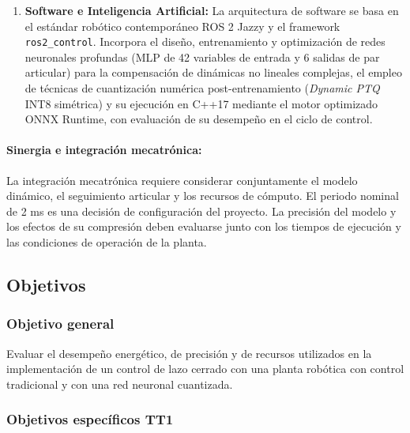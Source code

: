 \documentclass[12pt]{article}
\begin{document}
\begin{enumerate}[label=\textbf{\arabic*.}]
    \item \textbf{Software e Inteligencia Artificial:}
    La arquitectura de software se basa en el estándar robótico contemporáneo ROS 2 Jazzy y el framework \texttt{ros2\_control}. Incorpora el diseño, entrenamiento y optimización de redes neuronales profundas (MLP de 42 variables de entrada y 6 salidas de par articular) para la compensación de dinámicas no lineales complejas, el empleo de técnicas de cuantización numérica post-entrenamiento (\textit{Dynamic PTQ} INT8 simétrica) y su ejecución en C++17 mediante el motor optimizado ONNX Runtime, con evaluación de su desempeño en el ciclo de control.
\end{enumerate}

\paragraph*{Sinergia e integración mecatrónica:} 
La integración mecatrónica requiere considerar conjuntamente el modelo dinámico, el seguimiento articular y los recursos de cómputo. El periodo nominal de 2 ms es una decisión de configuración del proyecto. La precisión del modelo y los efectos de su compresión deben evaluarse junto con los tiempos de ejecución y las condiciones de operación de la planta.

\newpage

\subsection*{Objetivos}
\subsubsection*{Objetivo general}
Evaluar el desempeño energético, de precisión y de recursos utilizados en la implementación de un control de lazo cerrado con una planta robótica con control tradicional y con una red neuronal cuantizada.


\subsubsection*{Objetivos específicos TT1}
\end{document}
